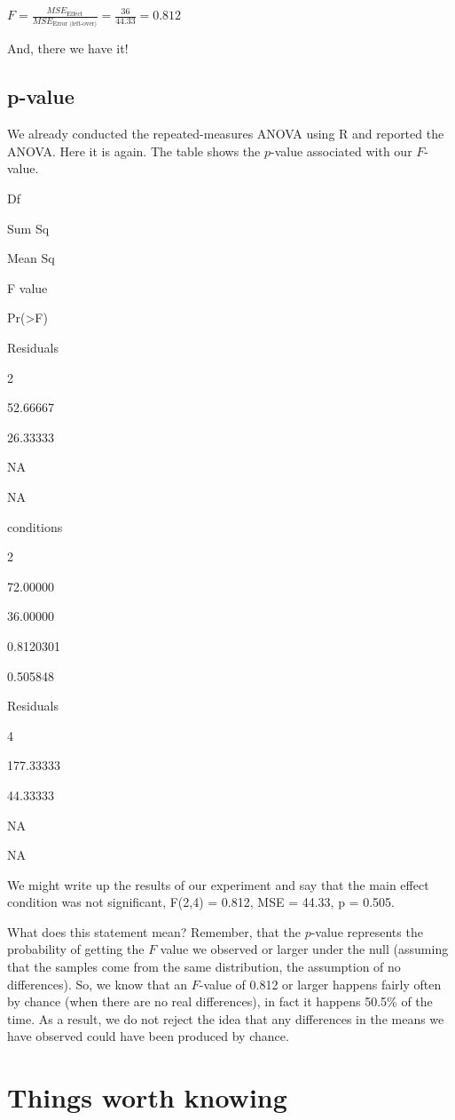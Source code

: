 \documentclass[
]{book}
\begin{document}
\(F = \frac{MSE_\text{Effect}}{MSE_\text{Error (left-over)}} = \frac{36}{44.33}= 0.812\)

And, there we have it!

\hypertarget{p-value}{%
\subsection{p-value}\label{p-value}}

We already conducted the repeated-measures ANOVA using R and reported the ANOVA. Here it is again. The table shows the \(p\)-value associated with our \(F\)-value.

Df

Sum Sq

Mean Sq

F value

Pr(\textgreater F)

Residuals

2

52.66667

26.33333

NA

NA

conditions

2

72.00000

36.00000

0.8120301

0.505848

Residuals

4

177.33333

44.33333

NA

NA

We might write up the results of our experiment and say that the main effect condition was not significant, F(2,4) = 0.812, MSE = 44.33, p = 0.505.

What does this statement mean? Remember, that the \(p\)-value represents the probability of getting the \(F\) value we observed or larger under the null (assuming that the samples come from the same distribution, the assumption of no differences). So, we know that an \(F\)-value of 0.812 or larger happens fairly often by chance (when there are no real differences), in fact it happens 50.5\% of the time. As a result, we do not reject the idea that any differences in the means we have observed could have been produced by chance.

\hypertarget{things-worth-knowing}{%
\section{Things worth knowing}\label{things-worth-knowing}}
\end{document}
